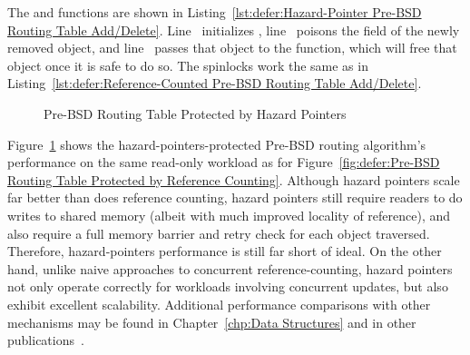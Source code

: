 \begin{fcvref}
The  and  functions are shown in
Listing~\ref{lst:defer:Hazard-Pointer Pre-BSD Routing Table Add/Delete}.
Line~ initializes ,
line~ poisons the  field of the newly removed
object, and
line~ passes that object to the
 function, which will free that object once it
is safe to do so.
The spinlocks work the same as in
Listing~\ref{lst:defer:Reference-Counted Pre-BSD Routing Table Add/Delete}.
\end{fcvref}

\begin{figure}[tb]
\centering
{}
\caption{Pre-BSD Routing Table Protected by Hazard Pointers}
\label{fig:defer:Pre-BSD Routing Table Protected by Hazard Pointers}
\end{figure}

Figure~\ref{fig:defer:Pre-BSD Routing Table Protected by Hazard Pointers}
shows the hazard-pointers-protected Pre-BSD routing algorithm's
performance on the same read-only workload as for
Figure~\ref{fig:defer:Pre-BSD Routing Table Protected by Reference Counting}.
Although hazard pointers scale far better than does reference counting,
hazard pointers still require readers to do writes to shared
memory (albeit with much improved locality of reference),
and also require a full memory barrier and retry check for each
object traversed.
Therefore, hazard-pointers performance is still far short of ideal.
On the other hand, unlike naive approaches to concurrent
reference-counting, hazard pointers not only operate correctly for
workloads involving concurrent updates, but also exhibit excellent
scalability.
Additional performance comparisons with other mechanisms may be found in
Chapter~\ref{chp:Data Structures}
and in other publications~\cite{ThomasEHart2007a,McKenney:2013:SDS:2483852.2483867,MagedMichael04a}.

